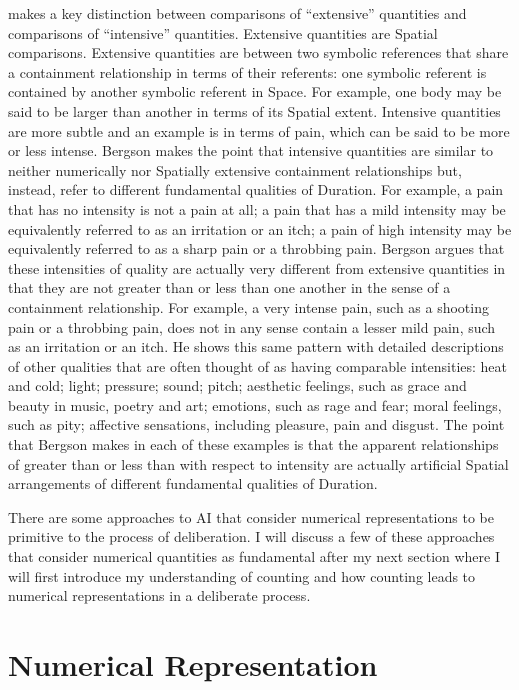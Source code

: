 \cite{bergson:1910} makes a key distinction between comparisons of
``extensive'' quantities and comparisons of ``intensive'' quantities.
Extensive quantities are Spatial comparisons.  Extensive quantities
are between two symbolic references that share a containment
relationship in terms of their referents: one symbolic referent is
contained by another symbolic referent in Space.  For example, one
body may be said to be larger than another in terms of its Spatial
extent.  Intensive quantities are more subtle and an example is in
terms of pain, which can be said to be more or less intense.  Bergson
makes the point that intensive quantities are similar to neither
numerically nor Spatially extensive containment relationships but,
instead, refer to different fundamental qualities of Duration.  For
example, a pain that has no intensity is not a pain at all; a pain
that has a mild intensity may be equivalently referred to as an
irritation or an itch; a pain of high intensity may be equivalently
referred to as a sharp pain or a throbbing pain.  Bergson argues that
these intensities of quality are actually very different from
extensive quantities in that they are not greater than or less than
one another in the sense of a containment relationship.  For example,
a very intense pain, such as a shooting pain or a throbbing pain, does
not in any sense contain a lesser mild pain, such as an irritation or
an itch.  He shows this same pattern with detailed descriptions of
other qualities that are often thought of as having comparable
intensities: heat and cold; light; pressure; sound; pitch; aesthetic
feelings, such as grace and beauty in music, poetry and art; emotions,
such as rage and fear; moral feelings, such as pity; affective
sensations, including pleasure, pain and disgust.  The point that
Bergson makes in each of these examples is that the apparent
relationships of greater than or less than with respect to intensity
are actually artificial Spatial arrangements of different fundamental
qualities of Duration.

There are some approaches to AI that consider numerical
representations to be primitive to the process of deliberation.  I
will discuss a few of these approaches that consider numerical
quantities as fundamental after my next section where I will first
introduce my understanding of counting and how counting leads to
numerical representations in a deliberate process.

\section{Numerical Representation}
\label{section:numerical_representation}

